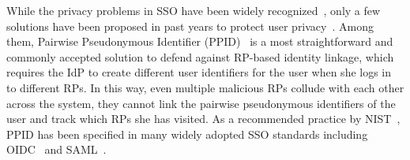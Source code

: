 
While the privacy problems in SSO have been widely recognized~\cite{maler2008venn,NIST2017draft}, only a few solutions have been proposed in past years to protect user privacy~\cite{persona,SPRESSO}. Among them, Pairwise Pseudonymous Identifier (PPID)~\cite{OpenIDConnect, SAMLIdentifier} is a most straightforward and commonly accepted solution to defend against RP-based identity linkage, which requires the IdP to create different user identifiers for the user when she logs in to different RPs. In this way, even multiple malicious RPs collude with each other across the system, they cannot link the  pairwise pseudonymous identifiers of the user and track which RPs she has visited. As a recommended practice by NIST~\cite{NIST2017draft}, PPID has been specified in many widely adopted SSO standards including OIDC~\cite{OpenIDConnect} and SAML~\cite{SAMLIdentifier}.




